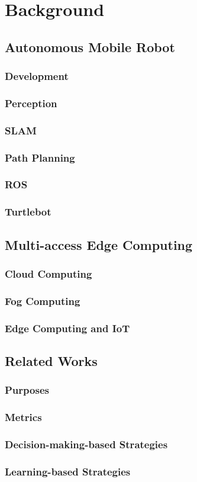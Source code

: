 \chapter{Background}

\section{Autonomous Mobile Robot}
\subsection{Development}
\subsection{Perception}
\subsection{SLAM}
\subsection{Path Planning}
\subsection{ROS}
\subsection{Turtlebot}

\section{Multi-access Edge Computing}
\subsection{Cloud Computing}
\subsection{Fog Computing}
\subsection{Edge Computing and IoT}

\section{Related Works}
\subsection{Purposes}
\subsection{Metrics}
\subsection{Decision-making-based Strategies}
\subsection{Learning-based Strategies}
